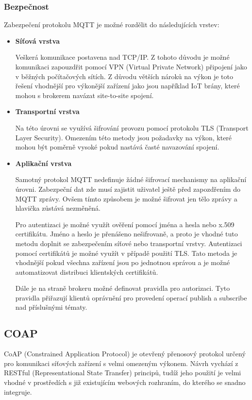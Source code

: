  \subsubsection{Bezpečnost}
 Zabezpečení protokolu MQTT je možné rozdělit do následujících vrstev:
 \begin{itemize}
  \item \textbf{Síťová vrstva}
  
    Veškerá komunikace postavena nad TCP/IP. Z tohoto důvodu je možné komunikaci
    zapouzdřit pomocí VPN (Virtual Private Network) připojení
    jako v běžných počítačových sítích. Z důvodu větších nároků na výkon je toto
    řešení vhodnější pro výkonější zařízení jako jsou například IoT brány, které
    mohou s brokerem navázat site-to-site spojení. \cite{mqtt_sec}
    
  \item \textbf{Transportní vrstva}
  
  Na této úrovni se využívá šifrování provozu pomocí protokolu TLS (Transport
  Layer Security). Omezením této metody jsou požadavky na výkon, které mohou být
  poměrně vysoké pokud nastává časté navazování spojení. \cite{mqtt_sec}
  
  \item \textbf{Aplikační vrstva}
  
  Samotný protokol MQTT nedefinuje žádné šifrovací mechanismy na aplikační úrovni. 
  Zabezpeční dat zde musí zajistit uživatel ještě před zapozdřením do MQTT zprávy. 
  Ovšem tímto způsobem je možné šifrovat jen tělo zprávy a hlavička zůstává nezměněná.
  
  Pro autentizaci je možné využít ověření pomocí jména a hesla nebo x.509 certifikátu.
  Jméno a heslo je přenášeno nešifrovaně, a proto je vhodné tuto metodu doplnit se 
  zabezpečením síťové nebo transportní vrstvy. Autentizaci pomocí certifikátů 
  je možné využít v případě použití TLS. Tato metoda je vhodnější pokud všechna
  zařízení jsou po jednotnou správou a je možné automatizovat distribuci 
  klientských certifikátů.
  
  Dále je na straně brokeru možné definovat pravidla pro autorizaci. Tyto pravidla 
  přiřazují klientů oprávnění pro provedení operací publish a subscribe
  nad příslušnými tématy. \cite{mqtt_sec}
  
 \end{itemize}

  \subsection{COAP}
  CoAP (Constrained Application Protocol) je otevřený přenosový protokol určený pro
  komunikaci síťových zařízení s velmi omezeným výkonem. Návrh vychází z RESTful
  (Representational State Transfer) principů, tudíž jeho použití je velmi vhodné
  v prostředích s již existujícím webových rozhraním, do kterého se snadno integruje. \cite{coap}
  
